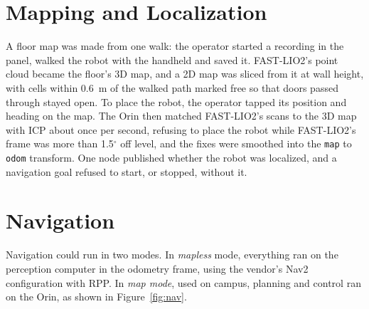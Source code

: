 \documentclass[11pt,a4paper]{article}
\begin{document}
\section{Mapping and Localization}

A floor map was made from one walk: the operator started a recording in the panel, walked the robot with
the handheld and saved it. FAST-LIO2's point cloud became the floor's 3D map, and a 2D map was sliced from
it at wall height, with cells within 0.6~m of the walked path marked free so that doors passed through
stayed open. To place the robot, the operator tapped its position and heading on the map. The Orin then
matched FAST-LIO2's scans to the 3D map with ICP about once per second, refusing to place the robot
while FAST-LIO2's frame was more than 1.5$^\circ$ off level, and the fixes were smoothed into the \texttt{map} to
\texttt{odom} transform. One node published whether the robot was localized, and a navigation goal
refused to start, or stopped, without it.

\section{Navigation}

Navigation could run in two modes. In \emph{mapless} mode, everything ran on the perception computer in
the odometry frame, using the vendor's Nav2 configuration with RPP. In \emph{map mode}, used on campus,
planning and control ran on the Orin, as shown in Figure~\ref{fig:nav}.
\end{document}
